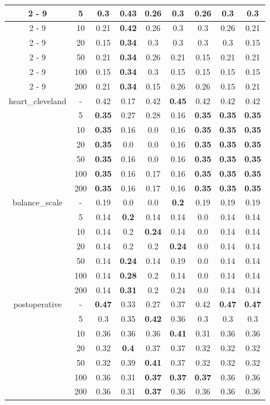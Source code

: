 \documentclass{article}%
\begin{document}
\begin{longtable}{c|c|ccccccc}
\cline{2%
-%
9}%
&5&0.3&\textbf{0.43}&0.26&0.3&0.26&0.3&0.3\\%
\cline{2%
-%
9}%
&10&0.21&\textbf{0.42}&0.26&0.3&0.3&0.26&0.21\\%
\cline{2%
-%
9}%
&20&0.15&\textbf{0.34}&0.3&0.3&0.3&0.3&0.15\\%
\cline{2%
-%
9}%
&50&0.21&\textbf{0.34}&0.26&0.21&0.15&0.21&0.21\\%
\cline{2%
-%
9}%
&100&0.15&\textbf{0.34}&0.3&0.15&0.15&0.15&0.15\\%
\cline{2%
-%
9}%
&200&0.21&\textbf{0.34}&0.15&0.26&0.26&0.15&0.21\\%
\hline%
\multirow{7}{*}{heart\_cleveland}&{-}&0.42&0.17&0.42&\textbf{0.45}&0.42&0.42&0.42\\%
\cline{2%
-%
9}%
&5&\textbf{0.35}&0.27&0.28&0.16&\textbf{0.35}&\textbf{0.35}&\textbf{0.35}\\%
\cline{2%
-%
9}%
&10&\textbf{0.35}&0.16&0.0&0.16&\textbf{0.35}&\textbf{0.35}&\textbf{0.35}\\%
\cline{2%
-%
9}%
&20&\textbf{0.35}&0.0&0.0&0.16&\textbf{0.35}&\textbf{0.35}&\textbf{0.35}\\%
\cline{2%
-%
9}%
&50&\textbf{0.35}&0.16&0.0&0.16&\textbf{0.35}&\textbf{0.35}&\textbf{0.35}\\%
\cline{2%
-%
9}%
&100&\textbf{0.35}&0.16&0.17&0.16&\textbf{0.35}&\textbf{0.35}&\textbf{0.35}\\%
\cline{2%
-%
9}%
&200&\textbf{0.35}&0.16&0.17&0.16&\textbf{0.35}&\textbf{0.35}&\textbf{0.35}\\%
\hline%
\multirow{7}{*}{balance\_scale}&{-}&0.19&0.0&0.0&\textbf{0.2}&0.19&0.19&0.19\\%
\cline{2%
-%
9}%
&5&0.14&\textbf{0.2}&0.14&0.14&0.0&0.14&0.14\\%
\cline{2%
-%
9}%
&10&0.14&0.2&\textbf{0.24}&0.14&0.0&0.14&0.14\\%
\cline{2%
-%
9}%
&20&0.14&0.2&0.2&\textbf{0.24}&0.0&0.14&0.14\\%
\cline{2%
-%
9}%
&50&0.14&\textbf{0.24}&0.14&0.19&0.0&0.14&0.14\\%
\cline{2%
-%
9}%
&100&0.14&\textbf{0.28}&0.2&0.14&0.0&0.14&0.14\\%
\cline{2%
-%
9}%
&200&0.14&\textbf{0.31}&0.2&0.24&0.0&0.14&0.14\\%
\hline%
\multirow{7}{*}{postoperative}&{-}&\textbf{0.47}&0.33&0.27&0.37&0.42&\textbf{0.47}&\textbf{0.47}\\%
\cline{2%
-%
9}%
&5&0.3&0.35&\textbf{0.42}&0.36&0.3&0.3&0.3\\%
\cline{2%
-%
9}%
&10&0.36&0.36&0.36&\textbf{0.41}&0.31&0.36&0.36\\%
\cline{2%
-%
9}%
&20&0.32&\textbf{0.4}&0.37&0.37&0.32&0.32&0.32\\%
\cline{2%
-%
9}%
&50&0.32&0.39&\textbf{0.41}&0.37&0.32&0.32&0.32\\%
\cline{2%
-%
9}%
&100&0.36&0.31&\textbf{0.37}&\textbf{0.37}&\textbf{0.37}&0.36&0.36\\%
\cline{2%
-%
9}%
&200&0.36&0.31&\textbf{0.37}&0.36&0.36&0.36&0.36\\%
\hline%
\end{longtable}

%
\end{document}
